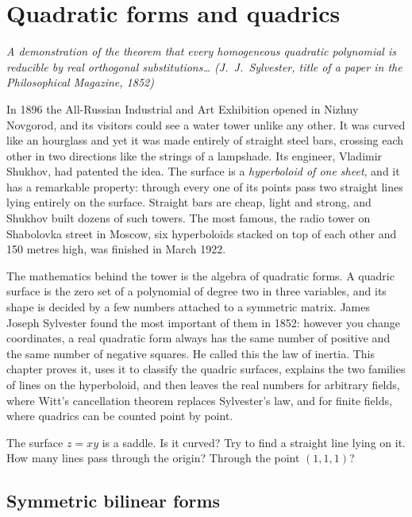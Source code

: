 \chapter{Quadratic forms and quadrics}\label{ch:quadrics}

\begin{center}\itshape
A demonstration of the theorem that every homogeneous quadratic polynomial is reducible by real orthogonal substitutions\dots
\upshape(J.~J.~Sylvester, title of a paper in the \emph{Philosophical Magazine}, 1852)
\end{center}

In 1896 the All-Russian Industrial and Art Exhibition opened in Nizhny Novgorod, and its visitors could see a water tower unlike any other. It
was curved like an hourglass and yet it was made entirely of straight steel bars, crossing each other in two directions like the strings of a
lampshade. Its engineer, Vladimir Shukhov, had patented the idea. The surface is a \emph{hyperboloid of one sheet}, and it has a remarkable property:
through every one of its points pass two straight lines lying entirely on the surface. Straight bars are cheap, light and strong, and Shukhov built
dozens of such towers. The most famous, the radio tower on Shabolovka street in Moscow, six hyperboloids stacked on top of each other and 150 metres
high, was finished in March 1922.

The mathematics behind the tower is the algebra of quadratic forms. A quadric surface is the zero set of a polynomial of degree two in three
variables, and its shape is decided by a few numbers attached to a symmetric matrix. James Joseph Sylvester found the most important of them in
1852: however you change coordinates, a real quadratic form always has the same number of positive and the same number of negative squares. He
called this the law of inertia. This chapter proves it, uses it to classify the quadric surfaces, explains the two families of lines on the
hyperboloid, and then leaves the real numbers for arbitrary fields, where Witt's cancellation theorem replaces Sylvester's law, and for finite fields,
where quadrics can be counted point by point.

\begin{think}
The surface $z=xy$ is a saddle. Is it curved? Try to find a straight line lying on it. How many lines pass through the origin? Through the point
$(1,1,1)$?
\end{think}

\section{Symmetric bilinear forms}

